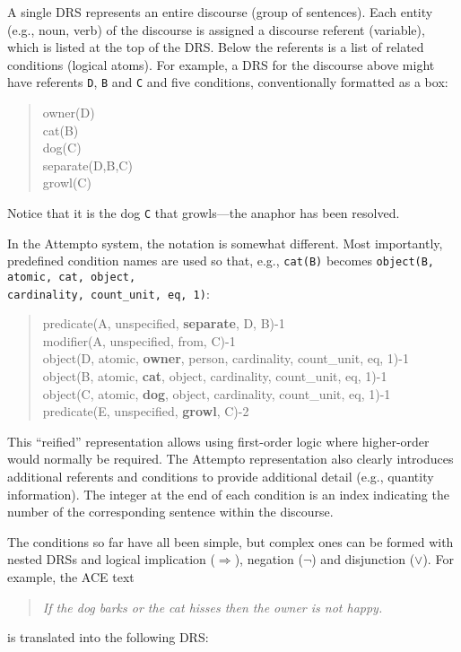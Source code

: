 \documentclass[12pt]{article}
\begin{document}
A single DRS represents an entire discourse (group of sentences). Each entity (e.g., noun, verb) of the discourse is assigned a discourse referent (variable), which is listed at the top of the DRS. Below the referents is a list of related conditions (logical atoms). For example, a DRS for the discourse above might have referents \verb|D|, \verb|B| and \verb|C| and five conditions, conventionally formatted as a box:
\begin{quote}
{
owner(D)\\
cat(B)\\
dog(C)\\
separate(D,B,C)\\
growl(C)
}
\end{quote}
Notice that it is the dog \verb|C| that growls---the anaphor has been resolved.

In the Attempto system, the notation is somewhat different. Most importantly, predefined condition names are used so that, e.g., \verb|cat(B)| becomes \verb|object(B, atomic, cat, object,|\\ \verb|cardinality, count_unit, eq, 1)|:
\begin{quote}
{
predicate(A, unspecified, \textbf{separate}, D, B)-1\\
modifier(A, unspecified, from, C)-1\\
object(D, atomic, \textbf{owner}, person, cardinality, count\_unit, eq, 1)-1\\
object(B, atomic, \textbf{cat}, object, cardinality, count\_unit, eq, 1)-1\\
object(C, atomic, \textbf{dog}, object, cardinality, count\_unit, eq, 1)-1\\
predicate(E, unspecified, \textbf{growl}, C)-2
}
\end{quote}
This ``reified'' representation allows using first-order logic where higher-order would normally be required. The Attempto representation also clearly introduces additional referents and conditions to provide additional detail (e.g., quantity information). The integer at the end of each condition is an index indicating the number of the corresponding sentence within the discourse.

The conditions so far have all been simple, but complex ones can be formed with nested DRSs and logical implication ($\Rightarrow$), negation ($\neg$) and disjunction ($\lor$). For example, the ACE text
\begin{quote}
\textit{If the dog barks or the cat hisses then the owner is not happy.}
\end{quote}
is translated into the following DRS:
\end{document}
